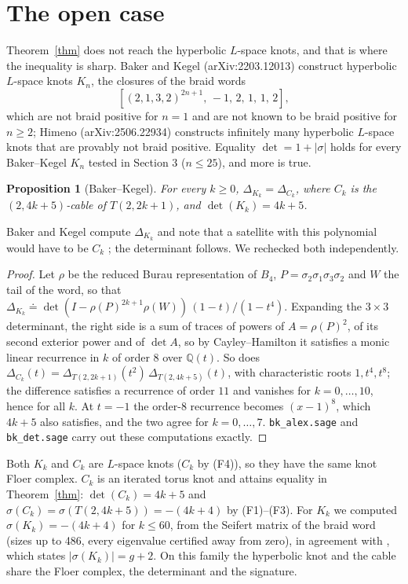 \documentclass[11pt]{article}
\newtheorem{proposition}{Proposition}
\theoremstyle{definition}
\begin{document}
\section{The open case}

Theorem~\ref{thm} does not reach the hyperbolic $L$-space knots, and that is where the inequality is sharp. Baker and
Kegel (arXiv:2203.12013) construct hyperbolic $L$-space knots $K_n$, the closures of the braid words
\[ [(2,1,3,2)^{2n+1},\, -1,\, 2,\, 1,\, 1,\, 2], \]
which are not braid positive for $n=1$ and are not known to be braid positive for $n \ge 2$; Himeno (arXiv:2506.22934) constructs infinitely many hyperbolic $L$-space knots that are provably not braid
positive. Equality $\det = 1 + |\sigma|$ holds for every Baker--Kegel $K_n$ tested in Section 3 ($n \le 25$), and more is true.

\begin{proposition}[Baker--Kegel]\label{prop:bk}
For every $k \ge 0$, $\Delta_{K_k} = \Delta_{C_k}$, where $C_k$ is the $(2,4k+5)$-cable of $T(2,2k+1)$, and
$\det(K_k) = 4k+5$.
\end{proposition}

\noindent Baker and Kegel compute $\Delta_{K_k}$ \cite[proof of Theorem 4.4]{BK} and note that a satellite with this
polynomial would have to be $C_k$ \cite[\S 2, second proof of Lemma 2.3]{BK}; the determinant follows. We rechecked
both independently.

\begin{proof}
Let $\rho$ be the reduced Burau representation of $B_4$, $P = \sigma_2\sigma_1\sigma_3\sigma_2$ and $W$ the tail of the
word, so that $\Delta_{K_k} \doteq \det(I - \rho(P)^{2k+1}\rho(W))\,(1-t)/(1-t^4)$. Expanding the $3 \times 3$ determinant,
the right side is a sum of traces of powers of $A = \rho(P)^2$, of its second exterior power and of $\det A$, so by
Cayley--Hamilton it satisfies a monic linear recurrence in $k$ of order $8$ over $\mathbb{Q}(t)$. So does
$\Delta_{C_k}(t) = \Delta_{T(2,2k+1)}(t^2)\,\Delta_{T(2,4k+5)}(t)$, with characteristic roots $1, t^4, t^8$; the
difference satisfies a recurrence of order $11$ and vanishes for $k = 0, \dots, 10$, hence for all $k$. At $t = -1$ the
order-$8$ recurrence becomes $(x-1)^8$, which $4k+5$ also satisfies, and the two agree for $k = 0, \dots, 7$.
\texttt{bk\_alex.sage} and \texttt{bk\_det.sage} carry out these computations exactly.
\end{proof}

Both $K_k$ and $C_k$ are $L$-space knots ($C_k$ by (F4)), so they have the same knot Floer complex. $C_k$ is an iterated
torus knot and attains equality in Theorem~\ref{thm}: $\det(C_k) = 4k+5$ and $\sigma(C_k) = \sigma(T(2,4k+5)) = -(4k+4)$
by (F1)--(F3). For $K_k$ we computed $\sigma(K_k) = -(4k+4)$ for $k \le 60$, from the Seifert matrix of the braid
word (sizes up to 486, every eigenvalue certified away from zero), in agreement with \cite[Remark 4.6]{BK}, which
states $|\sigma(K_k)| = g + 2$. On this family the hyperbolic knot and the cable share the Floer complex, the determinant
and the signature.
\end{document}
